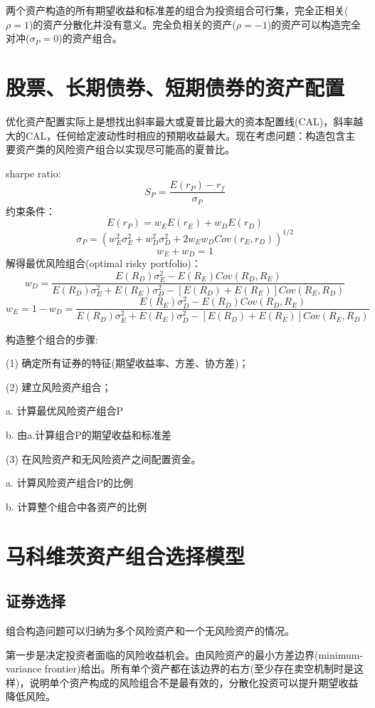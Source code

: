 \documentclass{article}
\begin{document}
两个资产构造的所有期望收益和标准差的组合为投资组合可行集，完全正相关($ \rho=1 $)的资产分散化并没有意义。完全负相关的资产($ \rho=-1 $)的资产可以构造完全对冲($ \sigma_P=0 $)的资产组合。

\section{股票、长期债券、短期债券的资产配置}
优化资产配置实际上是想找出斜率最大或夏普比最大的资本配置线(CAL)，斜率越大的CAL，任何给定波动性时相应的预期收益最大。现在考虑问题：构造包含主要资产类的风险资产组合以实现尽可能高的夏普比。

sharpe ratio:
\[
S_P=\frac{E(r_P)-r_f}{\sigma_P}
\]
约束条件：
\[
E(r_P)=w_EE(r_E)+w_DE(r_D)
\]
\[
\sigma_P=(w_E^2\sigma_E^2+w_D^2\sigma_D^2+2w_Ew_DCov(r_E,r_D))^{1/2}
\]
\[
w_E+w_D=1
\]
解得最优风险组合(optimal risky portfolio)：
\[
w_D=\frac{E(R_D)\sigma_E^2-E(R_E)Cov(R_D,R_E)}{E(R_D)\sigma_E^2+E(R_E)\sigma_D^2-[E(R_D)+E(R_E)]Cov(R_E,R_D)}
\]
\[
w_E=1-w_D=\frac{E(R_E)\sigma_D^2-E(R_D)Cov(R_D,R_E)}{E(R_D)\sigma_E^2+E(R_E)\sigma_D^2-[E(R_D)+E(R_E)]Cov(R_E,R_D)}
\]

\hspace*{\fill}

构造整个组合的步骤:

(1) 确定所有证券的特征(期望收益率、方差、协方差)；

\hspace*{\fill}

(2) 建立风险资产组合；

a. 计算最优风险资产组合P

b. 由a.计算组合P的期望收益和标准差

\hspace*{\fill}

(3) 在风险资产和无风险资产之间配置资金。

a. 计算风险资产组合P的比例

b. 计算整个组合中各资产的比例

\section{马科维茨资产组合选择模型}
\subsection{证券选择}
组合构造问题可以归纳为多个风险资产和一个无风险资产的情况。

第一步是决定投资者面临的风险收益机会。由风险资产的最小方差边界(minimum-variance frontier)给出。所有单个资产都在该边界的右方(至少存在卖空机制时是这样)，说明单个资产构成的风险组合不是最有效的，分散化投资可以提升期望收益降低风险。
\end{document}
